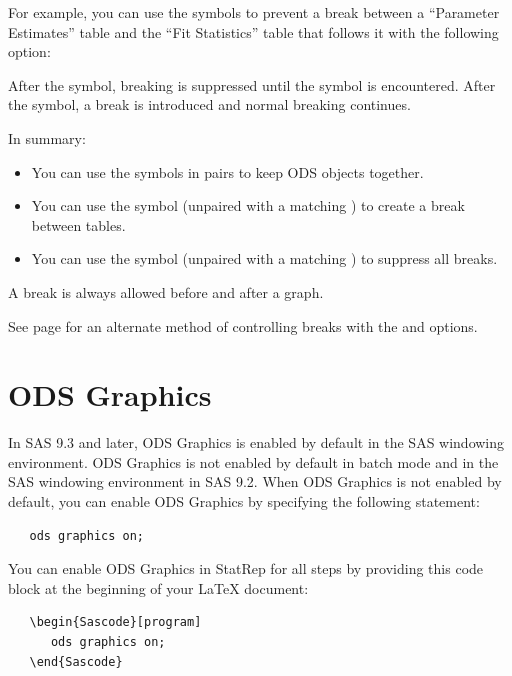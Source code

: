\documentclass[article,oneside]{memoir}
\newcommand*{\StatRep}{\textsf{StatRep}\xspace}
\begin{document}
  For example, you can use the symbols to prevent a break between a
  ``Parameter Estimates'' table and the ``Fit Statistics'' table that follows it
  with the following option:

  After the \Code{<} symbol, breaking is suppressed until the \Code{>} symbol is encountered.
  After the \Code{>} symbol, a break is introduced and normal breaking continues.

  In summary:
  \begin{itemize}
  \item You can use the \Code{<>} symbols in pairs to keep ODS objects together.
  \item You can use the \Code{>} symbol (unpaired with a matching \Code{<}) to create a break between tables.
  \item You can use the \Code{<} symbol (unpaired with a matching \Code{>}) to suppress all breaks.
  \end{itemize}

  A break is always allowed before and after a graph.

  See page \pageref{skiplast} for an alternate method of controlling breaks
  with the  and  options.

 \section{ODS Graphics}

 In SAS 9.3 and later, ODS Graphics is enabled by default in the SAS windowing environment.
 ODS Graphics is not enabled by default in batch mode and in the SAS windowing environment in SAS 9.2.
 When ODS Graphics is not enabled by default, you can enable ODS Graphics by specifying the following statement:

\begin{snugshade}
\begin{verbatim}
   ods graphics on;
\end{verbatim}
\end{snugshade}


You can enable ODS Graphics in \StatRep for all steps by providing this code block at the
beginning of your LaTeX document:

\begin{snugshade}
\begin{verbatim}
   \begin{Sascode}[program]
      ods graphics on;
   \end{Sascode}
\end{verbatim}
\end{snugshade}
\end{document}
